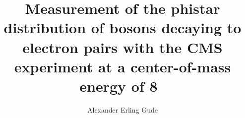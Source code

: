 \phd %

\title{
    \textbf{
        Measurement of the phistar distribution of \Z bosons decaying to
        electron pairs with the CMS experiment at a center-of-mass energy of
        8~\TeV
    }
}
\author{Alexander Erling Gude}


\abstract{}
\copyrightpage
\acknowledgements{}
\dedication{}

\beforepreface

\figurespage
\tablespage

\afterpreface

